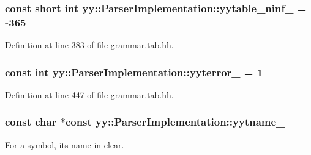 \hypertarget{classyy_1_1_parser_implementation_a77b627719b70a6e0abd7c6f61fe63fc8}{
\subsubsection[{yytable\_\-ninf\_\-}]{\setlength{\rightskip}{0pt plus 5cm}const short int {\bf yy::ParserImplementation::yytable\_\-ninf\_\-} = -\/365}}
\label{classyy_1_1_parser_implementation_a77b627719b70a6e0abd7c6f61fe63fc8}


Definition at line 383 of file grammar.tab.hh.

\hypertarget{classyy_1_1_parser_implementation_ac7dd39ad90b22b9c231e5ff2e794f7e0}{
\subsubsection[{yyterror\_\-}]{\setlength{\rightskip}{0pt plus 5cm}const int {\bf yy::ParserImplementation::yyterror\_\-} = 1}}
\label{classyy_1_1_parser_implementation_ac7dd39ad90b22b9c231e5ff2e794f7e0}


Definition at line 447 of file grammar.tab.hh.

\hypertarget{classyy_1_1_parser_implementation_a8dfff626efe4501693236fe9fa986990}{
\subsubsection[{yytname\_\-}]{\setlength{\rightskip}{0pt plus 5cm}const char $\ast$const {\bf yy::ParserImplementation::yytname\_\-}}}
\label{classyy_1_1_parser_implementation_a8dfff626efe4501693236fe9fa986990}


For a symbol, its name in clear. 



